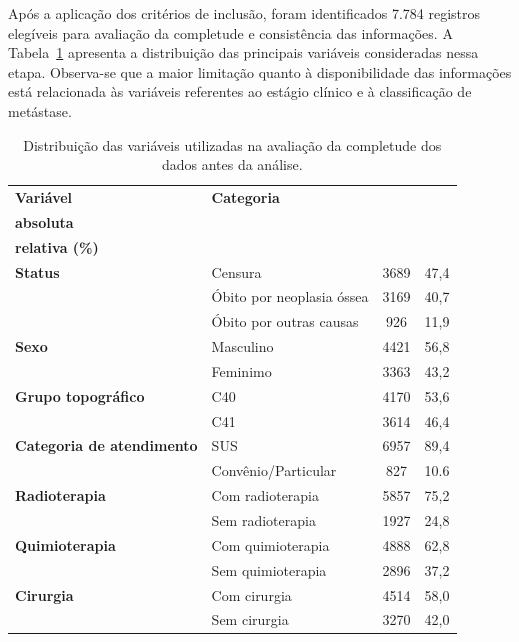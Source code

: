 \documentclass[11pt,a4paper]{article}
\begin{document}
Após a aplicação dos critérios de inclusão, foram identificados 7.784 registros elegíveis para avaliação da completude e consistência das informações. A Tabela~\ref{tab:completude_dados} apresenta a distribuição das principais variáveis consideradas nessa etapa. Observa-se que a maior limitação quanto à disponibilidade das informações está relacionada às variáveis referentes ao estágio clínico e à classificação de metástase.

\begin{table}[H]
\centering
\caption{Distribuição das variáveis utilizadas na avaliação da completude dos dados antes da análise.}
\label{tab:completude_dados}
\begin{tabular}{llcc}
\toprule
\textbf{Variável} & \textbf{Categoria} &
\makecell{\textbf{Frequência}\\\textbf{absoluta}} &
\makecell{\textbf{Frequência}\\\textbf{relativa (\%)}} \\
\midrule

\textbf{Status} 
& Censura & 3689 & 47,4 \\
& Óbito por neoplasia óssea & 3169 & 40,7 \\
& Óbito por outras causas & 926 & 11,9 \\
\midrule

\textbf{Sexo}
& Masculino & 4421 & 56,8 \\
& Feminimo & 3363 & 43,2 \\
\midrule

\textbf{Grupo topográfico}
& C40 & 4170 & 53,6 \\
& C41 & 3614 & 46,4 \\
\midrule

\textbf{Categoria de atendimento}
& SUS & 6957 & 89,4 \\
& Convênio/Particular & 827 & 10.6 \\
\midrule

\textbf{Radioterapia}
& Com radioterapia & 5857 & 75,2 \\
& Sem radioterapia & 1927 & 24,8 \\
\midrule

\textbf{Quimioterapia}
& Com quimioterapia & 4888 & 62,8 \\
& Sem quimioterapia & 2896 & 37,2 \\
\midrule

\textbf{Cirurgia}
& Com cirurgia & 4514 & 58,0 \\
& Sem cirurgia & 3270 & 42,0 \\
\midrule


\end{tabular}
\end{table}
\end{document}
